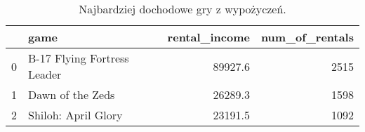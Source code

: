 \begin{table}[h]
\centering
\caption{Najbardziej dochodowe gry z wypożyczeń.}\label{tab:rentals}
\begin{tabular}{rlrr}
\hline
    & game                        &   rental\_income &   num\_of\_rentals \\
\hline
  0 & B-17 Flying Fortress Leader &         89927.6 &             2515 \\
  1 & Dawn of the Zeds            &         26289.3 &             1598 \\
  2 & Shiloh: April Glory         &         23191.5 &             1092 \\
\hline
\end{tabular}\end{table}